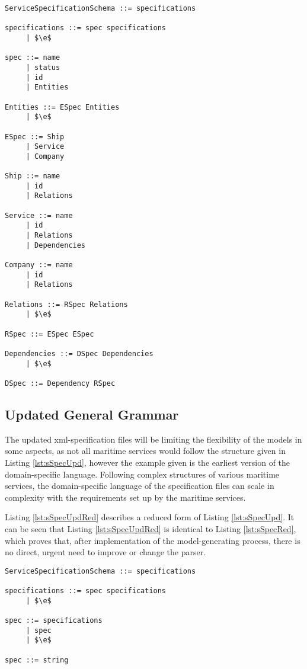 \begin{lstlisting}[keywordstyle={},label={lst:sSpecUpd},caption={Updated parser grammar of Service Specification Schema}]
ServiceSpecificationSchema ::= specifications

specifications ::= spec specifications
     | $\e$
     
spec ::= name
     | status
     | id
     | Entities

Entities ::= ESpec Entities
     | $\e$

ESpec ::= Ship
     | Service
     | Company

Ship ::= name
     | id
     | Relations

Service ::= name
     | id
     | Relations
     | Dependencies

Company ::= name
     | id
     | Relations

Relations ::= RSpec Relations
     | $\e$

RSpec ::= ESpec ESpec

Dependencies ::= DSpec Dependencies
     | $\e$

DSpec ::= Dependency RSpec
\end{lstlisting}

\subsection{Updated General Grammar}
The updated xml-specification files will be limiting the flexibility of the models in some aspects, as not all maritime services would follow the structure given in Listing \ref{lst:sSpecUpd}, however the example given is the earliest version of the domain-specific language. Following complex structures of various maritime services, the domain-specific language of the specification files can scale in complexity with the requirements set up by the maritime services.

Listing \ref{lst:sSpecUpdRed} describes a reduced form of Listing \ref{lst:sSpecUpd}. It can be seen that Listing \ref{lst:sSpecUpdRed} is identical to Listing \ref{lst:sSpecRed}, which proves that, after implementation of the model-generating process, there is no direct, urgent need to improve or change the parser.

\begin{lstlisting}[keywordstyle={}, label={lst:sSpecUpdRed}, caption={Reduced parser grammar of the updated Service Specification Schema}]
ServiceSpecificationSchema ::= specifications

specifications ::= spec specifications
     | $\e$
     
spec ::= specifications
     | spec
     | $\e$

spec ::= string
\end{lstlisting}

